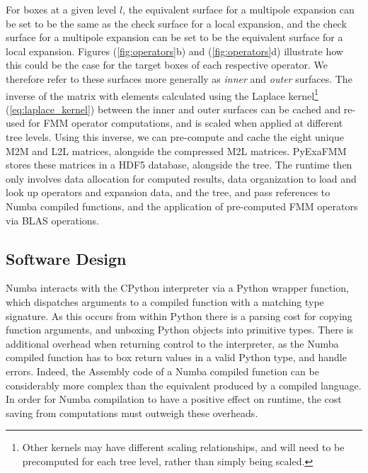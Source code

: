 \documentclass{IEEEcsmag}
\begin{document}
For boxes at a given level $l$, the equivalent surface for a multipole expansion can be set to be the same as the check surface for a local expansion, and the check surface for a multipole expansion can be set to be the equivalent surface for a local expansion. Figures (\ref{fig:operators}b) and (\ref{fig:operators}d) illustrate how this could be the case for the target boxes of each respective operator. We therefore refer to these surfaces more generally as \textit{inner} and \textit{outer} surfaces. The inverse of the matrix with elements calculated using the Laplace kernel\footnote{Other kernels may have different scaling relationships, and will need to be precomputed for each tree level, rather than simply being scaled.} (\ref{eq:laplace_kernel}) between the inner and outer surfaces can be cached and re-used for FMM operator computations, and is scaled when applied at different tree levels. Using this inverse, we can pre-compute and cache the eight unique M2M and L2L matrices, alongside the compressed M2L matrices. PyExaFMM stores these matrices in a HDF5 database, alongside the tree. The runtime then only involves data allocation for computed results, data organization to load and look up operators and expansion data, and the tree, and pass references to Numba compiled functions, and the application of pre-computed FMM operators via BLAS operations.

\subsection{Software Design}

Numba interacts with the CPython interpreter via a Python wrapper function, which dispatches arguments to a compiled function with a matching type signature. As this occurs from within  Python there is a parsing cost for copying function arguments, and unboxing Python objects into primitive types. There is additional overhead when returning control to the interpreter, as the Numba compiled function has to box return values in a valid Python type, and handle errors. Indeed, the Assembly code of a Numba compiled function can be considerably more complex than the equivalent produced by a compiled language. In order for Numba compilation to have a positive effect on runtime, the cost saving from computations must outweigh these overheads.
\end{document}
